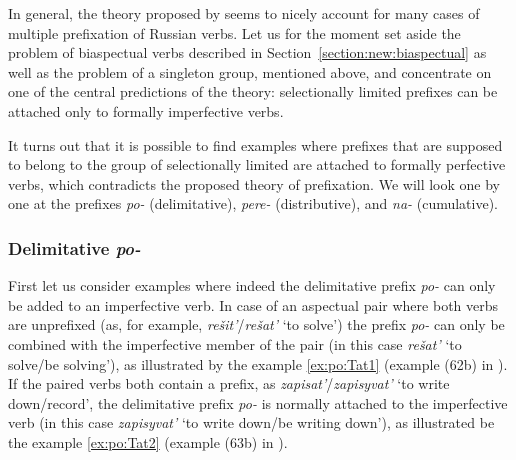 In general, the theory proposed by \citet{Tatevosov:09} seems to nicely account for many cases of multiple prefixation of Russian verbs. Let us for the moment set aside the problem of biaspectual verbs described in Section~\ref{section:new:biaspectual} as well as the problem of a singleton group, mentioned above, and concentrate on one of the central predictions of the theory: selectionally limited prefixes can be attached only to formally imperfective verbs.

It turns out that it is possible to find examples where prefixes that are supposed to belong to the group of selectionally limited are attached to formally perfective verbs, which contradicts the proposed theory of prefixation. We will look one by one at the prefixes \textit{po-} (delimitative), \textit{pere-} (distributive), and \textit{na-} (cumulative). 

\subsubsection{Delimitative \textit{po-}}
First let us consider examples where indeed the delimitative prefix \textit{po-} can only be added to an imperfective verb. In case of an aspectual pair where both verbs are unprefixed (as, for example, \textit{re\v{s}it'}\textsuperscript{\PF}\slash\textit{re\v{s}at'}\textsuperscript{\IPF} `to solve') the prefix \textit{po-} can only be combined with the imperfective member of the pair (in this case \textit{re\v{s}at'}\textsuperscript{\IPF} `to solve/be solving'), as illustrated by the example \ref{ex:po:Tat1} (example (62b) in \citealt[121]{Tatevosov:09}). If the paired verbs both contain a prefix, as \textit{zapisat'}\textsuperscript{\PF}\slash\textit{zapisyvat'}\textsuperscript{\IPF} `to write down/record', the delimitative prefix \textit{po-} is normally attached to the imperfective verb (in this case \textit{zapisyvat'}\textsuperscript{\IPF} `to write down/be writing down'), as illustrated be the example \ref{ex:po:Tat2} (example (63b) in \citealt[121]{Tatevosov:09}).

